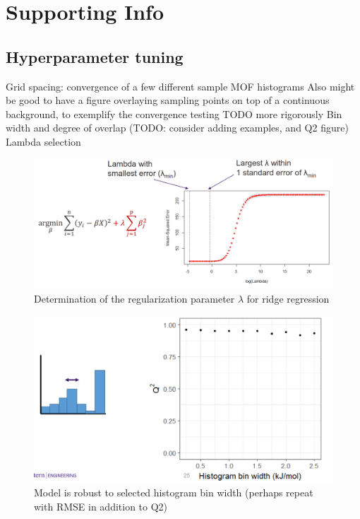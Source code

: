 \documentclass[letterpaper]{article}
\begin{document}
\pagebreak
\section{Supporting Info}

\subsection{Hyperparameter tuning}

\begin{outline}
	\1 Grid spacing: convergence of a few different sample MOF histograms
		\2 Also might be good to have a figure overlaying sampling points on top of a continuous background, to exemplify the convergence testing
		\2 TODO more rigorously
	\1 Bin width and degree of overlap (TODO: consider adding examples, and Q2 figure)
	\1 Lambda selection
	\begin{figure}[H]
		\centering
		\includegraphics[width=0.75\columnwidth]{Figs/lambda.png}
		\caption{Determination of the regularization parameter $\lambda$ for ridge regression}
		\label{fig:lambda}
	\end{figure}
\end{outline}

\begin{figure}[H]
	\centering
	\includegraphics[width=0.75\columnwidth]{Figs/tuning_bin_width.png}
	\caption{Model is robust to selected histogram bin width (perhaps repeat with RMSE in addition to Q2)}
	\label{fig:lambda}
\end{figure}
\end{document}

